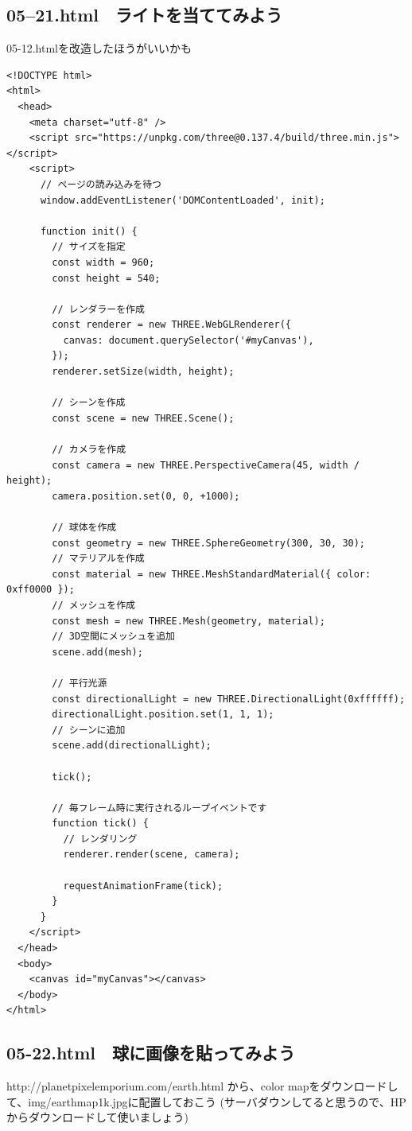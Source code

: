 \documentclass[mingoth,11pt,a4j,uplatex]{jsarticle}
\begin{document}
\subsection{05--21.html　ライトを当ててみよう}
05-12.htmlを改造したほうがいいかも
\begin{lstlisting}[caption=05-21.html]
<!DOCTYPE html>
<html>
  <head>
    <meta charset="utf-8" />
    <script src="https://unpkg.com/three@0.137.4/build/three.min.js"></script>
    <script>
      // ページの読み込みを待つ
      window.addEventListener('DOMContentLoaded', init);

      function init() {
        // サイズを指定
        const width = 960;
        const height = 540;

        // レンダラーを作成
        const renderer = new THREE.WebGLRenderer({
          canvas: document.querySelector('#myCanvas'),
        });
        renderer.setSize(width, height);

        // シーンを作成
        const scene = new THREE.Scene();

        // カメラを作成
        const camera = new THREE.PerspectiveCamera(45, width / height);
        camera.position.set(0, 0, +1000);

        // 球体を作成
        const geometry = new THREE.SphereGeometry(300, 30, 30);
        // マテリアルを作成
        const material = new THREE.MeshStandardMaterial({ color: 0xff0000 });
        // メッシュを作成
        const mesh = new THREE.Mesh(geometry, material);
        // 3D空間にメッシュを追加
        scene.add(mesh);

        // 平行光源
        const directionalLight = new THREE.DirectionalLight(0xffffff);
        directionalLight.position.set(1, 1, 1);
        // シーンに追加
        scene.add(directionalLight);

        tick();

        // 毎フレーム時に実行されるループイベントです
        function tick() {
          // レンダリング
          renderer.render(scene, camera);

          requestAnimationFrame(tick);
        }
      }
    </script>
  </head>
  <body>
    <canvas id="myCanvas"></canvas>
  </body>
</html>
\end{lstlisting}

\subsection{05-22.html　球に画像を貼ってみよう}
http://planetpixelemporium.com/earth.html
から、color mapをダウンロードして、img/earthmap1k.jpgに配置しておこう
(サーバダウンしてると思うので、HPからダウンロードして使いましょう)
\end{document}
